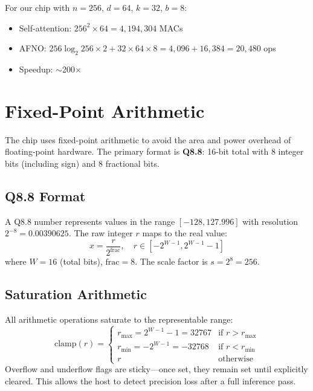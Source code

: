 \documentclass[11pt,a4paper]{article}
\theoremstyle{definition}
\theoremstyle{remark}
\begin{document}
For our chip with $n=256$, $d=64$, $k=32$, $b=8$:
\begin{itemize}[noitemsep]
  \item Self-attention: $256^2 \times 64 = 4{,}194{,}304$ MACs
  \item AFNO: $256 \log_2 256 \times 2 + 32 \times 64 \times 8 = 4{,}096 + 16{,}384 = 20{,}480$ ops
  \item Speedup: $\sim$200$\times$
\end{itemize}

\section{Fixed-Point Arithmetic}

The chip uses fixed-point arithmetic to avoid the area and power overhead of
floating-point hardware. The primary format is \textbf{Q8.8}: 16-bit total with
8 integer bits (including sign) and 8 fractional bits.

\subsection{Q8.8 Format}

A Q8.8 number represents values in the range $[-128, 127.996]$ with resolution
$2^{-8} = 0.00390625$. The raw integer $r$ maps to the real value:
\begin{equation}
  x = \frac{r}{2^{\text{frac}}}, \quad r \in [-2^{W-1}, 2^{W-1}-1]
  \label{eq:q88}
\end{equation}
where $W = 16$ (total bits), $\text{frac} = 8$. The scale factor is $s = 2^8 = 256$.

\subsection{Saturation Arithmetic}

All arithmetic operations saturate to the representable range:
\begin{equation}
  \text{clamp}(r) = \begin{cases}
    r_{\max} = 2^{W-1} - 1 = 32767 & \text{if } r > r_{\max} \\
    r_{\min} = -2^{W-1} = -32768 & \text{if } r < r_{\min} \\
    r & \text{otherwise}
  \end{cases}
\end{equation}
Overflow and underflow flags are sticky---once set, they remain set until
explicitly cleared. This allows the host to detect precision loss after a
full inference pass.
\end{document}
